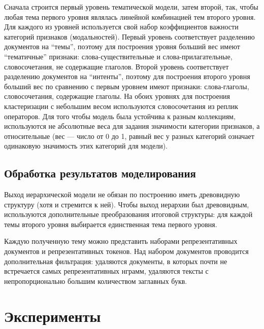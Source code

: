 Сначала строится первый уровень тематической модели, затем второй, так, чтобы любая тема первого уровня являлась линейной комбинацией тем второго уровня. Для каждого из уровней используется свой набор коэффициентов важности категорий признаков (модальностей).
Первый уровень соответствует разделению документов на “темы”, поэтому для построения уровня больший вес имеют “тематичные” признаки: слова-существительные и слова-прилагательные, словосочетания, не содержащие глаголов.
Второй уровень соответствует разделению документов на “интенты”, поэтому для построения второго уровня больший вес по сравнению с первым уровнем имеют признаки: слова-глаголы, словосочетания, содержащие глаголы.
На обоих уровнях для построения кластеризации с небольшим весом используются словосочетания из реплик операторов. Для того чтобы модель была устойчива к разным коллекциям, используются не абсолютные веса для задания значимости категории признаков, а относительные (вес — число от 0 до 1, равный вес у разных категорий означает одинаковую значимость этих категорий для модели).

\subsection{Обработка результатов моделирования}

Выход иерархической модели не обязан по построению иметь древовидную структуру (хотя и стремится к ней). Чтобы выход иерархии был древовидным, используются дополнительные преобразования итоговой структуры: для каждой темы второго уровня выбирается единственная тема первого уровня.

Каждую полученную тему можно представить наборами репрезентативных документов и репрезентативных токенов. Над набором документов проводится дополнительная фильтрация: удаляются документы, в которых почти не встречается самых репрезентативных нграмм, удаляются тексты с непропорционально большим количеством заглавных букв.

\section{Эксперименты}

